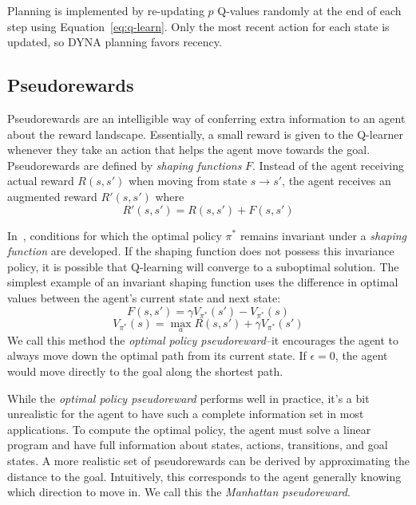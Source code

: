 \documentclass[notitlepage]{article}
\begin{document}
Planning is implemented by re-updating $p$ Q-values randomly at the end of each step using Equation~\ref{eq:q-learn}. Only the most recent action for each state is updated, so DYNA planning favors recency.

\subsection*{Pseudorewards}

Pseudorewards are an intelligible way of conferring extra information to an agent about the reward landscape. Essentially, a small reward is given to the Q-learner whenever they take an action that helps the agent move towards the goal. Pseudorewards are defined by \textit{shaping functions} $F$. Instead of the agent receiving actual reward $R(s, s')$ when moving from state $s \rightarrow s'$, the agent receives an augmented reward $R'(s, s')$ where
\begin{equation}
R'(s, s') = R(s, s') + F(s, s')
\end{equation} 

 In~\cite{ng1999policy}, conditions for which the optimal policy $\pi^*$ remains invariant under a \textit{shaping function} are developed. If the shaping function does not possess this invariance policy, it is possible that Q-learning will converge to a suboptimal solution. The simplest example of an invariant shaping function uses the difference in optimal values between the agent's current state and next state:
\begin{equation}
F(s, s') = \gamma V_{\pi^*}(s') - V_{\pi^*}(s) 
\end{equation}
\begin{equation}
V_{\pi^*}(s) =  \max_{a} R(s, s') + \gamma V_{\pi^*}(s')
\end{equation}
We call this method the \textit{optimal policy pseudoreward}--it encourages the agent to always move down the optimal path from its current state. If $\epsilon = 0$, the agent would move directly to the goal along the shortest path.

While the \textit{optimal policy pseudoreward} performs well in practice, it's a bit unrealistic for the agent to have such a complete information set in most applications. To compute the optimal policy, the agent must solve a linear program and have full information about states, actions, transitions, and goal states. A more realistic set of pseudorewards can be derived by approximating the distance to the goal. Intuitively, this corresponds to the agent generally knowing which direction to move in. We call this the \textit{Manhattan pseudoreward}.
\end{document}
